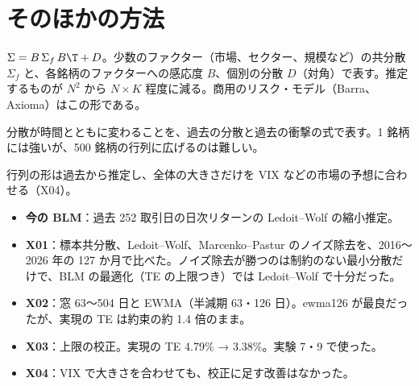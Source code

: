\section{そのほかの方法}

\begin{description}[leftmargin=1.5em,style=nextline]
\item[ファクター・モデル] $\Sigma = B\,\Sigma_f\,B\T + D$。少数のファクター（市場、セクター、規模など）の共分散 $\Sigma_f$ と、各銘柄のファクターへの感応度 $B$、個別の分散 $D$（対角）で表す。推定するものが $N^2$ から $N\times K$ 程度に減る。商用のリスク・モデル（Barra、Axioma）はこの形である。
\item[GARCH] 分散が時間とともに変わることを、過去の分散と過去の衝撃の式で表す。1 銘柄には強いが、500 銘柄の行列に広げるのは難しい。
\item[予想ボラティリティで合わせる] 行列の形は過去から推定し、全体の大きさだけを VIX などの市場の予想に合わせる（X04）。
\end{description}

\begin{projbox}
\begin{itemize}
\item \textbf{今の BLM}：過去 252 取引日の日次リターンの Ledoit--Wolf の縮小推定。
\item \textbf{X01}：標本共分散、Ledoit--Wolf、Marcenko--Pastur のノイズ除去を、2016〜2026 年の 127 か月で比べた。ノイズ除去が勝つのは制約のない最小分散だけで、BLM の最適化（TE の上限つき）では Ledoit--Wolf で十分だった。
\item \textbf{X02}：窓 63〜504 日と EWMA（半減期 63・126 日）。ewma126 が最良だったが、実現の TE は約束の約 1.4 倍のまま。
\item \textbf{X03}：上限の校正。実現の TE 4.79\% → 3.38\%。実験 7・9 で使った。
\item \textbf{X04}：VIX で大きさを合わせても、校正に足す改善はなかった。
\end{itemize}
\end{projbox}

